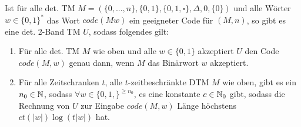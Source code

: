 \begin{satz}{}
    Ist für alle det. TM $M = (\{0, ..., n\}, \{0, 1\}, \{0, 1, \square\}, \Delta, 0, \{0\})$ und alle Wörter $w \in \{0, 1\}^*$ das Wort $code(Mw)$ ein geeigneter Code für $(M, n)$, so gibt es eine det. 2-Band TM $U$, sodass folgendes gilt:
    
    \begin{enumerate}[label=(\roman*)]
        \item Für alle det. TM $M$ wie oben und alle $w \in\{0, 1\}$ akzeptiert $U$ den Code $code(M, w)$ genau dann, wenn $M$ das Binärwort $w$ akzeptiert.
        \item Für alle Zeitschranken $t$, alle $t$-zeitbeschränkte DTM $M$ wie oben, gibt es ein $n_0 \in \mathbb{N}$, sodass $\forall w \in \{0, 1,\}^{\geq n_0}$, es eine konstante $c \in \mathbb{N}_0$ gibt, sodass die Rechnung von $U$ zur Eingabe $code(M, w)$ Länge höchstens $ct(|w|) \log (t|w|)$ hat.
    \end{enumerate}
    

\end{satz}
